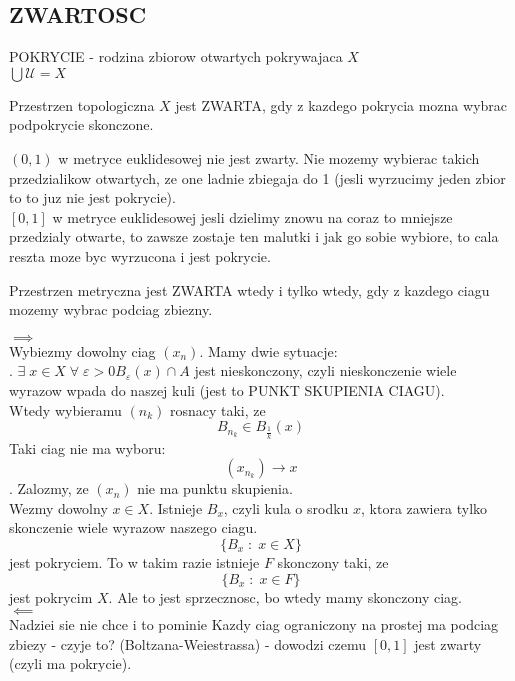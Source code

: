 \documentclass{article}
\begin{document}
\subsection*{ZWARTOSC}
\begin{center}\large
    {\color{def}POKRYCIE }- rodzina zbiorow otwartych pokrywajaca $X$\smallskip\\
    $\bigcup \mathcal{U}=X$
\end{center}
\begin{center}\large
    Przestrzen topologiczna $X$ jest {\color{def}ZWARTA}, gdy z kazdego pokrycia mozna wybrac podpokrycie skonczone.
\end{center}\bigskip
$(0,1)$ w metryce euklidesowej nie jest zwarty. Nie mozemy wybierac takich przedzialikow otwartych, ze one ladnie zbiegaja do 1 (jesli wyrzucimy jeden zbior to to juz nie jest pokrycie).\medskip\\
$[0,1]$ w metryce euklidesowej jesli dzielimy znowu na coraz to mniejsze przedzialy otwarte, to zawsze zostaje ten malutki i jak go sobie wybiore, to cala reszta moze byc wyrzucona i jest pokrycie.\bigskip
\begin{center}\large
    Przestrzen metryczna jest {\color{def}ZWARTA }wtedy i tylko wtedy, gdy z kazdego ciagu mozemy wybrac podciag zbiezny.
\end{center}\bigskip
\dowod
$\implies$\medskip\\
Wybiezmy dowolny ciag $(x_n)$. Mamy dwie sytuacje:\smallskip\\
. $\exists\;x\in X\;\forall\;\varepsilon>0 B_\varepsilon(x)\cap A$ jest nieskonczony, czyli nieskonczenie wiele wyrazow wpada do naszej kuli (jest to \color{emp} PUNKT SKUPIENIA CIAGU\color{txt}).\smallskip\\
Wtedy wybieramu $(n_k)$ rosnacy taki, ze
$$B_{n_k}\in B_\frac1k(x)$$
Taki ciag nie ma wyboru:
$$(x_{n_k})\to x$$
. Zalozmy, ze $(x_n)$ nie ma punktu skupienia.\smallskip\\
Wezmy dowolny $x\in X$. Istnieje $B_x$, czyli kula o srodku $x$, ktora zawiera tylko skonczenie wiele wyrazow naszego ciagu.
$$\{B_x\;:\;x\in X\}$$
jest pokryciem. To w takim razie istnieje $F$ skonczony taki, ze
$$\{B_x\;:\;x\in F\}$$
jest pokrycim $X$. Ale to jest sprzecznosc, bo wtedy mamy skonczony ciag.\bigskip\\
$\impliedby$\medskip\\
Nadziei sie nie chce i to pominie
\kondow
Kazdy ciag ograniczony na prostej ma podciag zbiezy - czyje to? {\color{emp}(Boltzana-Weiestrassa)} - dowodzi czemu $[0,1]$ jest zwarty (czyli ma pokrycie).
\end{document}
